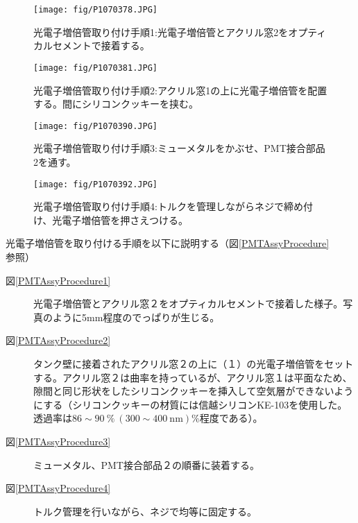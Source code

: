 \documentclass[11pt]{jreport}
\newcommand{\figref}[1]{図\ref{#1}}
\begin{document}
\begin{figure}[htbp]
\begin{minipage}{0.47\textwidth}
\centering
\texttt{[image: fig/P1070378.JPG]}
\caption[光電子増倍管取り付け手順1]{光電子増倍管取り付け手順1:光電子増倍管とアクリル窓2をオプティカルセメントで接着する。}
\label{SetPMTTest}
\end{minipage}
\hfil%
\begin{minipage}{0.47\textwidth}
\centering
\texttt{[image: fig/P1070381.JPG]}
\caption[光電子増倍管取り付け手順2]{光電子増倍管取り付け手順2:アクリル窓1の上に光電子増倍管を配置する。間にシリコンクッキーを挟む。}
\label{SetPMTTest}
\end{minipage}
\end{figure}
%
\begin{figure}[htbp]
\begin{minipage}{0.47\textwidth}
\centering
\texttt{[image: fig/P1070390.JPG]}
\caption[光電子増倍管取り付け手順3]{光電子増倍管取り付け手順3:ミューメタルをかぶせ、PMT接合部品2を通す。}
\label{SetPMTTest}
\end{minipage}
\hfil%
\begin{minipage}{0.47\textwidth}
\centering
\texttt{[image: fig/P1070392.JPG]}
\caption[光電子増倍管取り付け手順4]{光電子増倍管取り付け手順4:トルクを管理しながらネジで締め付け、光電子増倍管を押さえつける。}
\label{SetPMTTest}
\end{minipage}
\end{figure}
\fi

光電子増倍管を取り付ける手順を以下に説明する（\figref{PMTAssyProcedure}参照）
\begin{description}
\item[\figref{PMTAssyProcedure1}] 光電子増倍管とアクリル窓２をオプティカルセメントで接着した様子。写真のように5mm程度のでっぱりが生じる。
\item[\figref{PMTAssyProcedure2}] タンク壁に接着されたアクリル窓２の上に（１）の光電子増倍管をセットする。アクリル窓２は曲率を持っているが、アクリル窓１は平面なため、隙間と同じ形状をしたシリコンクッキーを挿入して空気層ができないようにする（シリコンクッキーの材質には信越シリコンKE-103を使用した。透過率は$86\sim90\ \%\ (300\sim400\ \mathrm{nm})$\%程度である）。
\item[\figref{PMTAssyProcedure3}] ミューメタル、PMT接合部品２の順番に装着する。
\item[\figref{PMTAssyProcedure4}] トルク管理を行いながら、ネジで均等に固定する。
\end{description}
\end{document}
